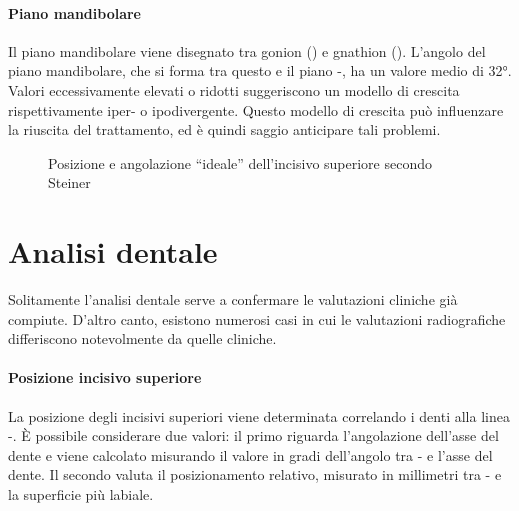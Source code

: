 \paragraph{Piano mandibolare}
Il piano mandibolare viene disegnato tra gonion () e gnathion (). L'angolo del piano mandibolare, che si forma tra questo e il piano -, ha un valore medio di 32°. Valori eccessivamente elevati o ridotti suggeriscono un modello di crescita rispettivamente iper- o ipodivergente. Questo modello di crescita può influenzare la riuscita del trattamento, ed è quindi saggio anticipare tali problemi.

\begin{figure}
 \centering
 \caption{Posizione e angolazione ``ideale'' dell'incisivo superiore secondo Steiner}
 \label{fig:steiner_incisivo_superiore}
\end{figure}

\section{Analisi dentale}
Solitamente l'analisi dentale serve a confermare le valutazioni cliniche già compiute. D'altro canto, esistono numerosi casi in cui le valutazioni radiografiche differiscono notevolmente da quelle cliniche.

\paragraph{Posizione incisivo superiore}
La posizione degli incisivi superiori viene determinata correlando i denti alla linea -. È possibile considerare due valori: il primo riguarda l'angolazione dell'asse del dente e viene calcolato misurando il valore in gradi dell'angolo tra - e l'asse del dente. Il secondo valuta il posizionamento relativo, misurato in millimetri tra - e la superficie più labiale.

